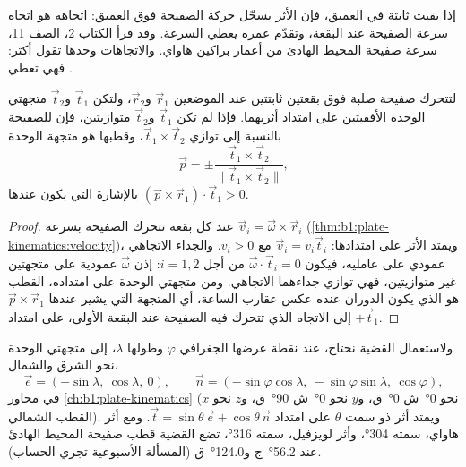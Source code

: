 إذا بقيت  ثابتة في  العميق، فإن الأثر يسجّل حركة الصفيحة فوق  العميق: اتجاهه هو اتجاه سرعة الصفيحة عند البقعة، وتقدّم عمره يعطي السرعة. وقد قرأ الكتاب 2، الصف 11، سرعة صفيحة المحيط الهادئ من أعمار براكين هاواي. والاتجاهات وحدها تقول أكثر: فهي تعطي .

\begin{proposition}\label{prop:b1:hotspots:two-tracks}
لتتحرك صفيحة صلبة فوق بقعتين ثابتتين عند الموضعين $\vec r_1$ و$\vec r_2$، ولتكن $\vec t_1$ و$\vec t_2$ متجهتي الوحدة الأفقيتين على امتداد أثريهما. فإذا لم تكن $\vec t_1$ و$\vec t_2$ متوازيتين، فإن  للصفيحة بالنسبة إلى  توازي $\vec t_1\times\vec t_2$، وقطبها هو متجهة الوحدة
\[
  \vec p = \pm\frac{\vec t_1\times\vec t_2}{\lVert\vec t_1\times\vec t_2\rVert},
\]
بالإشارة التي يكون عندها $(\vec p\times\vec r_1)\cdot\vec t_1 > 0$.
\end{proposition}

\begin{proof}
عند كل بقعة تتحرك الصفيحة بسرعة $\vec v_i = \vec\omega\times\vec r_i$ (\cref{thm:b1:plate-kinematics:velocity})، ويمتد الأثر على امتدادها: $\vec v_i = v_i\vec t_i$ مع $v_i > 0$. والجداء الاتجاهي عمودي على عامليه، فيكون $\vec\omega\cdot\vec t_i = 0$ من أجل $i = 1, 2$: إذن $\vec\omega$ عمودية على متجهتين غير متوازيتين، فهي توازي جداءهما الاتجاهي. ومن متجهتي الوحدة على امتداده، القطب هو الذي يكون الدوران عنده عكس عقارب الساعة، أي المتجهة التي يشير عندها $\vec p\times\vec r_1$ إلى الاتجاه الذي تتحرك فيه الصفيحة عند البقعة الأولى، على امتداد $+\vec t_1$.
\end{proof}

ولاستعمال القضية نحتاج، عند نقطة عرضها الجغرافي $\varphi$ وطولها $\lambda$، إلى متجهتي الوحدة نحو الشرق والشمال،
\[
  \vec e = (-\sin\lambda,\ \cos\lambda,\ 0),\qquad
  \vec n = (-\sin\varphi\cos\lambda,\ -\sin\varphi\sin\lambda,\ \cos\varphi),
\]
في محاور \cref{ch:b1:plate-kinematics} ($x$ نحو \ang{0}~ش \ang{0}~ق، و$y$ نحو \ang{0}~ش \ang{90}~ق، و$z$ نحو القطب الشمالي). ويمتد أثر ذو سمت $\theta$ على امتداد $\vec t = \sin\theta\,\vec e +
\cos\theta\,\vec n$. ومع أثر هاواي، سمته \ang{304}، وأثر لويزفيل، سمته \ang{316}، تضع القضية قطب صفيحة المحيط الهادئ عند \ang{56.2}~ج و\ang{124.0}~ق (المسألة الأسبوعية تجري الحساب).


